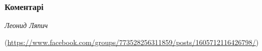  
 
 
 
 
\subsubsection{Коментарі}

\begin{itemize}
\emph{Леонид Ляпич}

(\url{https://www.facebook.com/groups/773528256311859/posts/1605712116426798/})


\end{itemize}
